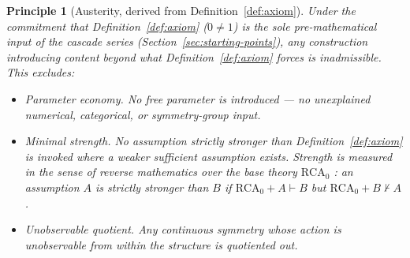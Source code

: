 \documentclass[11pt,a4paper]{article}
\newtheorem{principle}[theorem]{Principle}
\begin{document}
\begin{principle}[Austerity, derived from Definition~\ref{def:axiom}]\label{princ:austerity}
Under the commitment that Definition~\ref{def:axiom} ($0\neq 1$) is the
sole pre-mathematical input of the cascade series
(Section~\ref{sec:starting-points}), any construction introducing content
beyond what Definition~\ref{def:axiom} forces is inadmissible. This
excludes:
\begin{itemize}
\item[(i)] \emph{Parameter economy.} No free parameter is introduced ---
no unexplained numerical, categorical, or symmetry-group input.
\item[(ii)] \emph{Minimal strength.} No assumption strictly stronger than
Definition~\ref{def:axiom} is invoked where a weaker sufficient assumption
exists. Strength is measured in the sense of reverse mathematics over
the base theory $\mathrm{RCA}_0$
\cite{friedman1975,simpson2009}: an assumption $A$ is strictly
stronger than $B$ if $\mathrm{RCA}_0 + A \vdash B$ but
$\mathrm{RCA}_0 + B \nvdash A$.
\item[(iii)] \emph{Unobservable quotient.} Any continuous symmetry whose
action is unobservable from within the structure is quotiented out.
\end{itemize}
\end{principle}
\end{document}

